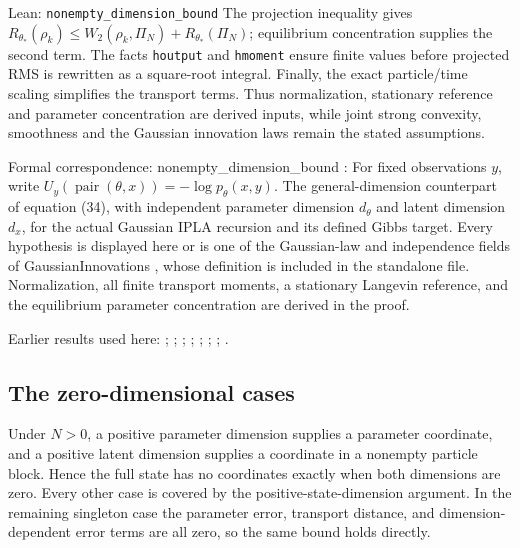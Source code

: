 \documentclass[11pt,a4paper]{report}
\begin{document}
\begin{leanbox}{Lean: \texttt{nonempty\_\allowbreak{}dimension\_\allowbreak{}bound}}
The projection inequality gives \(R_{\theta_*}(\rho_k)\le W_2(\rho_k,\Pi_N)+R_{\theta_*}(\Pi_N)\); equilibrium concentration supplies the second term. The facts \texttt{houtput} and \texttt{hmoment} ensure finite values before projected RMS is rewritten as a square-root integral. Finally, the exact particle/\allowbreak{}time scaling simplifies the transport terms. Thus normalization, stationary reference and parameter concentration are derived inputs, while joint strong convexity, smoothness and the Gaussian innovation laws remain the stated assumptions.



Formal correspondence: nonempty\_dimension\_bound : For fixed observations \(y\), write \(U_y(\operatorname{pair}(\theta,x))=-\log p_\theta(x,y)\). The general-dimension counterpart of equation (34), with independent parameter dimension \(d_\theta\) and latent dimension \(d_x\), for the actual Gaussian IPLA recursion and its defined Gibbs target. Every hypothesis is displayed here or is one of the Gaussian-law and independence fields of GaussianInnovations , whose definition is included in the standalone file. Normalization, all finite transport moments, a stationary Langevin reference, and the equilibrium parameter concentration are derived in the proof.
\end{leanbox}


Earlier results used here: \cite[Section~3.17.4]{LangevinLean2026ULASC}; \cite[Section~3.26.3]{LangevinLean2026ULASC}; \cite[Section~3.45.6]{LangevinLean2026ULASC}; \cite[Section~3.48.6]{LangevinLean2026ULASC}; \cite[Section~3.48.7]{LangevinLean2026ULASC}; \cite[Section~3.48.9]{LangevinLean2026ULASC}; \cite[Section~3.50.2]{LangevinLean2026ULASC}; \cite[Section~3.50.3]{LangevinLean2026ULASC}.
\subsection{\texorpdfstring{The zero-dimensional cases}{The zero-dimensional cases}}
\label{report-step-IPLA-Theorem-lean-2}


Under \(N>0\), a positive parameter dimension supplies a parameter coordinate, and a positive latent dimension supplies a coordinate in a nonempty particle block. Hence the full state has no coordinates exactly when both dimensions are zero. Every other case is covered by the positive-state-dimension argument. In the remaining singleton case the parameter error, transport distance, and dimension-dependent error terms are all zero, so the same bound holds directly.
\end{document}

